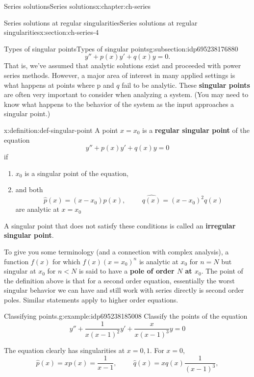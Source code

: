 \documentclass[oneside,10pt,]{book}
\newcommand{\terminology}[1]{\textbf{#1}}
\numberwithin{equation}{section}
\numberwithin{equation}{section}
\newcommand{\lt}{<}
\begin{document}
\begin{chapterptx}{Series solutions}{}{Series solutions}{}{}{x:chapter:ch-series}
\begin{sectionptx}{Series solutions at regular singularities}{}{Series solutions at regular singularities}{}{}{x:section:ch-series-4}
\begin{subsectionptx}{Types of singular points}{}{Types of singular points}{}{}{g:subsection:idp695238176880}
\begin{equation*}
y'' + p(x)y' + q(x)y = 0.
\end{equation*}
That is, we've assumed that analytic solutions exist and proceeded with power series methods. However, a major area of interest in many applied settings is what happens at points where p%
 and \(q\) fail to be analytic. These \terminology{singular points} are often very important to consider when analyzing a system. (You may need to know what happens to the behavior of the system as the input approaches a singular point.)%
\begin{definition}{}{x:definition:def-singular-point}%
A point \(x = x_0\) is a \terminology{regular singular point} of the equation%
\begin{equation*}
y'' + p(x)y' + q(x) y= 0
\end{equation*}
if%
\begin{enumerate}
\item{}\(x_0\) is a singular point of the equation,%
\item{}and both%
\begin{equation*}
\hat{p}(x) = (x - x_0)p(x), \hspace{1cm} \hat{q(x)}=(x-x_0)^2 q(x)
\end{equation*}
are analytic at \(x = x_0\)%
\end{enumerate}
A singular point that does not satisfy these conditions is called an \terminology{irregular singular point}.%
\end{definition}
To give you some terminology (and a connection with complex analysis), a function \(f(x)\) for which \(f(x)(x = x_0)^n\) is analytic at \(x_0\) for \(n = N\) but singular at \(x_0\) for \(n \lt N\) is said to have a \terminology{pole of order \(N\) at \(x_0\)}. The point of the definition above is that for a second order equation, essentially the worst singular behavior we can have and still work with series directly is second order poles. Similar statements apply to higher order equations.%
\begin{example}{Classifying points.}{g:example:idp695238185008}%
Classify the points of the equation%
\begin{equation*}
y'' + \frac{1}{x(x-1)^2}y' + \frac{x}{x(x-1)^3} y = 0
\end{equation*}
%
\par
The equation clearly has singularities at \(x = 0, 1\). For \(x = 0\),%
\begin{equation*}
\hat{p}(x) = x p(x) = \frac{1}{x - 1}, \hspace{1cm} \hat{q}(x) = xq(x) \frac{1}{(x-1)^3},

\end{equation*}
\end{example}
\end{subsectionptx}
\end{sectionptx}
\end{chapterptx}
\end{document}
